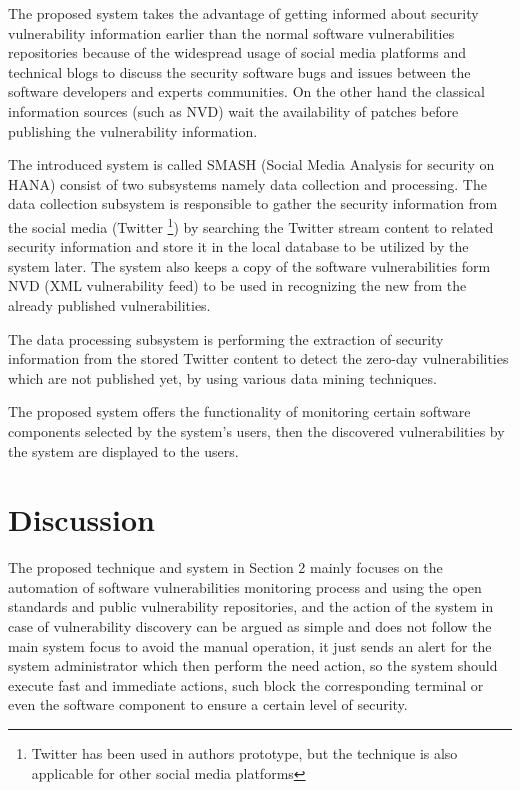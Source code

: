 \documentclass{llncs}
\begin{document}
The proposed system takes the advantage of getting informed about security vulnerability information earlier than the normal software vulnerabilities repositories because of the widespread usage of social media platforms and technical blogs to discuss the security software bugs and issues between the software developers and experts communities. On the other hand the classical information sources (such as NVD) wait the availability of patches before publishing the vulnerability information.

\par The introduced system is called SMASH (Social Media Analysis for security on HANA) consist of two subsystems namely data collection and processing. The data collection subsystem is responsible to gather the security information from the social media (Twitter \footnote{Twitter has been used in authors prototype, but the technique is also applicable for other social media platforms}) by searching the Twitter stream content to related security information and store it in the local database to be utilized by the system later. The system also keeps a copy of the software vulnerabilities form NVD (XML vulnerability feed) to be used in recognizing the new from the already published vulnerabilities.
\par
The data processing subsystem is performing the extraction of security information from the stored Twitter content to detect the zero-day vulnerabilities which are not published yet, by using various data mining techniques.

The proposed system offers the functionality of monitoring certain software components selected by the system's users, then the discovered vulnerabilities  by the system are displayed to the users.
  

\newpage
\section{Discussion}

\par The proposed technique and system in Section 2 mainly focuses on the automation of software vulnerabilities monitoring process and using the open standards and public vulnerability repositories, and the action of the system in case of vulnerability  discovery can be argued as simple and does not follow the main system focus to avoid the manual operation, it just sends an alert for the system administrator which then perform the need action, so the system should execute fast and immediate actions, such block the corresponding terminal or even the software component to ensure a certain level of security. 
\end{document}
